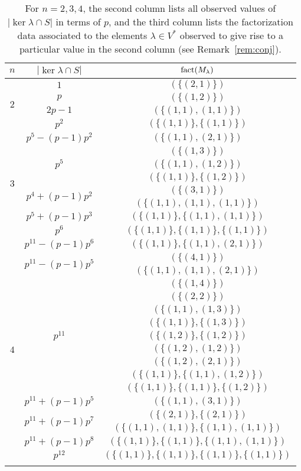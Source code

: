\begin{table}[h]
\begin{tabular}{ccc}
\toprule
$n$&$|\ker\lambda\cap S|$&$\operatorname{fact}(M_\lambda)$\\
\midrule
\multirow{4}{*}{$2$}&$1$&$(\{(2,1)\})$\\
\cmidrule(l){2-3}
&$p$&$(\{(1,2)\})$\\
\cmidrule(l){2-3}
&$2p-1$&$(\{(1,1),(1,1)\})$\\
\cmidrule(l){2-3}
&$p^2$&$(\{(1,1)\},\{(1,1)\})$\\
\midrule
\multirow{8}{*}{$3$}&$p^5-(p-1)p^2$&$(\{(1,1),(2,1)\})$\\
\cmidrule(l){2-3}
&\multirow{3}{*}{$p^5$}&$(\{(1,3)\})$\\
&&$(\{(1,1),(1,2)\})$\\
&&$(\{(1,1)\},\{(1,2)\})$\\
\cmidrule(l){2-3}
&\multirow{2}{*}{$p^4+(p-1)p^2$}&$(\{(3,1)\})$\\
&&$(\{(1,1),(1,1),(1,1)\})$\\
\cmidrule(l){2-3}
&$p^5+(p-1)p^3$&$(\{(1,1)\},\{(1,1),(1,1)\})$\\
\cmidrule(l){2-3}
&$p^6$&$(\{(1,1)\},\{(1,1)\},\{(1,1)\})$\\
\midrule
\multirow{17}{*}{$4$}&$p^{11}-(p-1)p^6$&$(\{(1,1)\},\{(1,1),(2,1)\})$\\
\cmidrule(l){2-3}
&\multirow{2}{*}{$p^{11}-(p-1)p^5$}&$(\{(4,1)\})$\\
&&$(\{(1,1),(1,1),(2,1)\})$\\
\cmidrule(l){2-3}
&\multirow{9}{*}{$p^{11}$}&$(\{(1,4)\})$\\
&&$(\{(2,2)\})$\\
&&$(\{(1,1),(1,3)\})$\\
&&$(\{(1,1)\},\{(1,3)\})$\\
&&$(\{(1,2)\},\{(1,2)\})$\\
&&$(\{(1,2),(1,2)\})$\\
&&$(\{(1,2),(2,1)\})$\\
&&$(\{(1,1)\},\{(1,1),(1,2)\})$\\
&&$(\{(1,1)\},\{(1,1)\},\{(1,2)\})$\\
\cmidrule(l){2-3}
&$p^{11}+(p-1)p^5$&$(\{(1,1),(3,1)\})$\\
\cmidrule(l){2-3}
&\multirow{2}{*}{$p^{11}+(p-1)p^7$}&$(\{(2,1)\},\{(2,1)\})$\\
&&$(\{(1,1),(1,1)\},\{(1,1),(1,1)\})$\\
\cmidrule(l){2-3}
&$p^{11}+(p-1)p^8$&$(\{(1,1)\},\{(1,1)\},\{(1,1),(1,1)\})$\\
\cmidrule(l){2-3}
&$p^{12}$&$(\{(1,1)\},\{(1,1)\},\{(1,1)\},\{(1,1)\})$\\
\bottomrule\\
\end{tabular}
\label{tab:lowdim}
\caption{For $n=2,3,4$, the second column lists all observed values of $|\ker\lambda\cap S|$ in terms of $p$, and the third column lists the factorization data associated to the elements $\lambda\in V^*$ observed to give rise to a particular value in the second column (see Remark~\ref{rem:conj}).}
\end{table}

